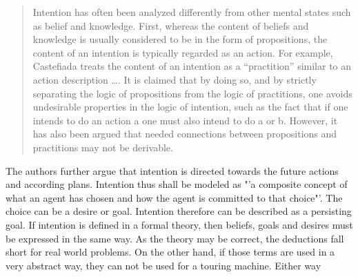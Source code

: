 \begin{quotation}
  Intention has often been analyzed differently from other mental states such as belief and knowledge. First, whereas the content of beliefs and knowledge is usually considered to be in the form of propositions, the content of an intention is typically regarded as an action. For example, Castefiada treats the content of an intention as a "`practition"' similar to an action description \dots. It is claimed that by doing so, and by strictly separating the logic of propositions from the logic of practitions, one avoids undesirable properties in the logic of intention, such as the fact that if one intends to do an action a one must also intend to do a or b. However, it has also been argued that needed connections between propositions and practitions may not be derivable.
\end{quotation}

The authors further argue that intention is directed towards the future actions and according plans. Intention thus shall be modeled as "'a composite concept of what an agent has chosen and how the agent is committed to that choice"'. The choice can be a desire or goal. Intention therefore can be described as a persisting goal. If intention is defined in a formal theory, then beliefs, goals and desires must be expressed in the same way. As the theory may be correct, the deductions fall short for real world problems. On the other hand, if those terms are used in a very abstract way, they can not be used for a touring machine. Either way
